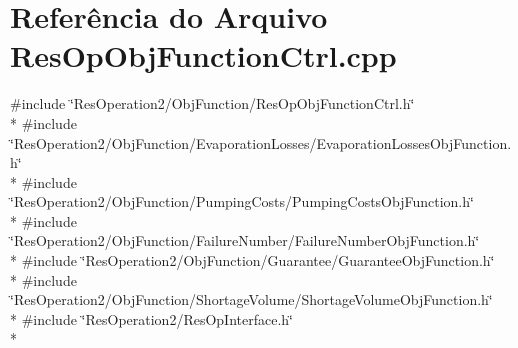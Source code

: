 \section{Referência do Arquivo Res\+Op\+Obj\+Function\+Ctrl.\+cpp}
\label{_res_op_obj_function_ctrl_8cpp}
{\ttfamily \#include \char`\"{}Res\+Operation2/\+Obj\+Function/\+Res\+Op\+Obj\+Function\+Ctrl.\+h\char`\"{}}\\*
{\ttfamily \#include \char`\"{}Res\+Operation2/\+Obj\+Function/\+Evaporation\+Losses/\+Evaporation\+Losses\+Obj\+Function.\+h\char`\"{}}\\*
{\ttfamily \#include \char`\"{}Res\+Operation2/\+Obj\+Function/\+Pumping\+Costs/\+Pumping\+Costs\+Obj\+Function.\+h\char`\"{}}\\*
{\ttfamily \#include \char`\"{}Res\+Operation2/\+Obj\+Function/\+Failure\+Number/\+Failure\+Number\+Obj\+Function.\+h\char`\"{}}\\*
{\ttfamily \#include \char`\"{}Res\+Operation2/\+Obj\+Function/\+Guarantee/\+Guarantee\+Obj\+Function.\+h\char`\"{}}\\*
{\ttfamily \#include \char`\"{}Res\+Operation2/\+Obj\+Function/\+Shortage\+Volume/\+Shortage\+Volume\+Obj\+Function.\+h\char`\"{}}\\*
{\ttfamily \#include \char`\"{}Res\+Operation2/\+Res\+Op\+Interface.\+h\char`\"{}}\\*
